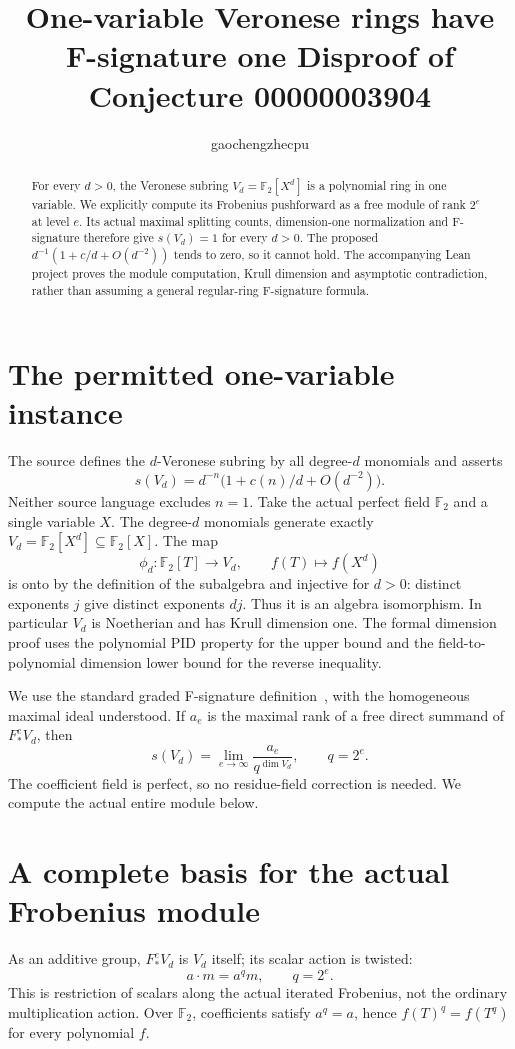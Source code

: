 \documentclass[11pt]{article}
\title{One-variable Veronese rings have F-signature one\newline
\large Disproof of Conjecture 00000003904}
\author{gaochengzhecpu}\date{}
\newcommand{\F}{\mathbb F}
\begin{document}
\maketitle
\begin{abstract}
For every $d>0$, the Veronese subring $V_d=\F_2[X^d]$
is a polynomial ring in one variable. We explicitly compute its
Frobenius pushforward as a free module of rank $2^e$ at level $e$.
Its actual maximal splitting counts, dimension-one normalization
and F-signature therefore give $s(V_d)=1$ for every $d>0$.
The proposed $d^{-1}(1+c/d+O(d^{-2}))$ tends to zero, so it cannot
hold. The accompanying Lean project proves the module computation,
Krull dimension and asymptotic contradiction, rather than assuming
a general regular-ring F-signature formula.
\end{abstract}

\section*{The permitted one-variable instance}
The source defines the $d$-Veronese subring by all degree-$d$
monomials and asserts
\[
 s(V_d)=d^{-n}\bigl(1+c(n)/d+O(d^{-2})\bigr).
\]
Neither source language excludes $n=1$. Take the actual perfect
field $\F_2$ and a single variable $X$. The degree-$d$ monomials
generate exactly $V_d=\F_2[X^d]\subseteq\F_2[X]$.
The map
\[
 \phi_d:\F_2[T]\longrightarrow V_d,\qquad f(T)\longmapsto f(X^d)
\]
is onto by the definition of the subalgebra and injective for $d>0$:
distinct exponents $j$ give distinct exponents $dj$.
Thus it is an algebra isomorphism. In particular $V_d$ is
Noetherian and has Krull dimension one. The formal dimension
proof uses the polynomial PID property for the upper bound and
the field-to-polynomial dimension lower bound for the reverse inequality.

We use the standard graded F-signature definition~\cite{Singh},
with the homogeneous maximal ideal understood. If $a_e$ is the
maximal rank of a free direct summand of $F_*^e V_d$, then
\[
 s(V_d)=\lim_{e\to\infty}\frac{a_e}{q^{\dim V_d}},\qquad q=2^e.
\]
The coefficient field is perfect, so no residue-field correction is
needed. We compute the actual entire module below.

\newpage
\section*{A complete basis for the actual Frobenius module}
As an additive group, $F_*^e V_d$ is $V_d$ itself; its scalar
action is twisted:
\[
 a\cdot m=a^q m,\qquad q=2^e.
\]
This is restriction of scalars along the actual iterated Frobenius,
not the ordinary multiplication action.
Over $\F_2$, coefficients satisfy $a^q=a$, hence
$f(T)^q=f(T^q)$ for every polynomial $f$.
\end{document}
